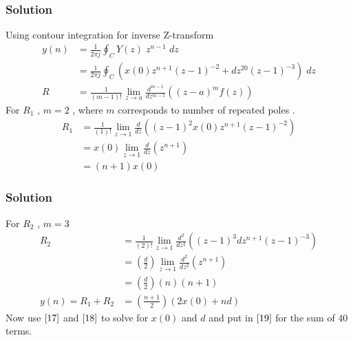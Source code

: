 \documentclass{beamer}
\providecommand{\brak}[1]{\ensuremath{\left(#1\right)}}
\theoremstyle{remark}
\begin{document}
\begin{frame}
\frametitle{Solution}
Using contour integration for inverse Z-transform
\begin{align}
    y(n)&=\frac{1}{2\pi j}\oint_{C}Y(z) \;z^{n-1} \;dz\\  
 &=\frac{1}{2\pi j}\oint_{C}\brak{x(0)z^{n+1}\brak{z-1}^{-2}+
       dz^{20}\brak{z-1}^{-3}} \;dz\\
       R&=\frac{1}{\brak {m-1}!}\lim\limits_{z\to a}\frac{d^{m-1}}{dz^{m-1}}\brak {{(z-a)}^{m}f\brak z}
\end{align}
For $R_1$ , $m=2$ , where $m$ corresponds to number of repeated poles .
\begin{align}
    R_1 &=\frac{1}{\brak {1}!}\lim\limits_{z\to 1}\frac{d}{dz}\brak {{(z-1)}^{2}x(0)z^{n+1}\brak{z-1}^{-2}}   \\
    &=x(0)\lim\limits_{z\to 1}\frac{d}{dz}(z^{n+1})   \\
    &= \brak{n+1}x(0)
    \end{align}
\end{frame}












\begin{frame}
\frametitle{Solution}
   For $R_2$ , $m=3$ 
    \begin{align}
    R_2 &=\frac{1}{\brak {2}!}\lim\limits_{z\to 1}\frac{d^{2}}{dz^{2}}\brak {{(z-1)}^{3}dz^{n+1}\brak{z-1}^{-3}}   \\
        &=\brak{\frac{d}{2}}\lim\limits_{z\to 1}\frac{d^2}{dz^2}(z^{n+1})   \\
    &= \brak{\frac{d}{2}}\brak{n}\brak{n+1}\\
   y(n)= R_1 + R_2 &= \brak{\frac{n+1}{2}}\brak{2x(0) + nd} \label{19}
\end{align}
Now use $\eqref{17}$ and $\eqref{18}$ to solve for $x(0)$ and $d$ and put in $\eqref{19}$ for the sum of $40$ terms.
\end{frame} 
\end{document}
